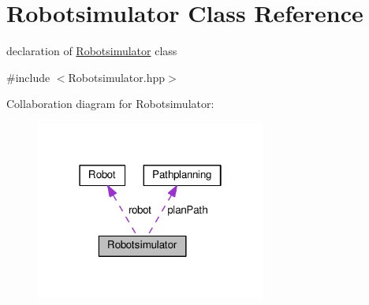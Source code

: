 \hypertarget{classRobotsimulator}{}\section{Robotsimulator Class Reference}
\label{classRobotsimulator}


declaration of \hyperlink{classRobotsimulator}{Robotsimulator} class  




{\ttfamily \#include $<$Robotsimulator.\+hpp$>$}



Collaboration diagram for Robotsimulator\+:
\nopagebreak
\begin{figure}[H]
\begin{center}
\leavevmode
\includegraphics[width=214pt]{classRobotsimulator__coll__graph}
\end{center}
\end{figure}
